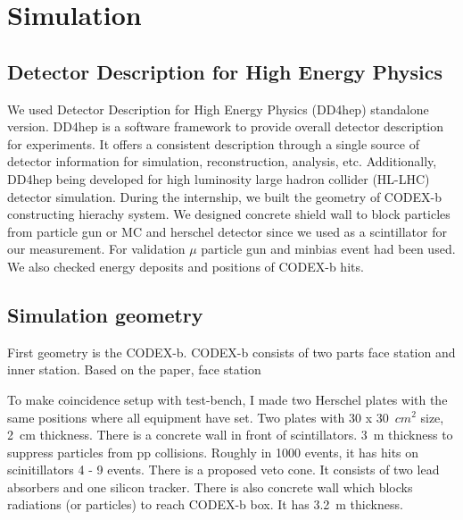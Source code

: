 \section{Simulation}
\label{sec:Simulation}

\subsection{Detector Description for High Energy Physics}
We used Detector Description for High Energy Physics (DD4hep) standalone version.
DD4hep is a software framework to provide overall detector description for experiments.
It offers a consistent description through a single source of detector information for simulation, reconstruction, analysis, etc.
Additionally, DD4hep being developed for high luminosity large hadron collider (HL-LHC) detector simulation.
During the internship, we built the geometry of CODEX-b constructing hierachy system.
We designed concrete shield wall to block particles from particle gun or MC and herschel detector since we used as a scintillator for our measurement.
For validation $\mu$ particle gun and minbias event had been used.
We also checked energy deposits and positions of CODEX-b hits. 


\subsection{Simulation geometry}
First geometry is the CODEX-b.
CODEX-b consists of two parts face station and inner station.
Based on the paper, face station 


To make coincidence setup with test-bench, I made two Herschel plates with the same positions where all equipment have set.
Two plates with 30 x 30~$cm^{2}$ size, 2~cm thickness.
There is a concrete wall in front of scintillators.
3~m thickness to suppress particles from pp collisions.
Roughly in 1000 events, it has hits on scinitillators 4 - 9 events.
There is a proposed veto cone. It consists of two lead absorbers and one silicon tracker.
There is also concrete wall which blocks radiations (or particles) to reach CODEX-b box. 
It has 3.2~m thickness.

